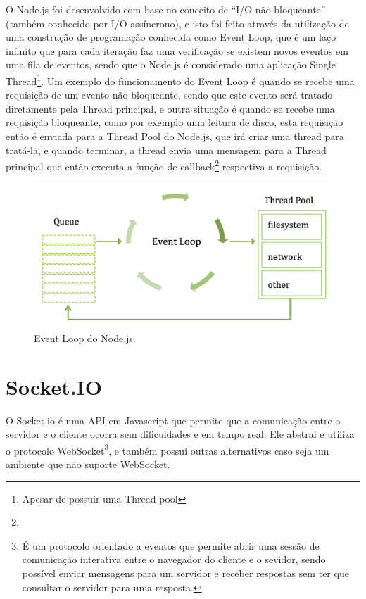 O Node.js foi desenvolvido com base no conceito de “I/O não bloqueante”\cite{nodeRight}  (também conhecido por I/O assíncrono), e isto foi feito através da utilização de uma construção  de programação conhecida como  Event Loop, que é um laço infinito que para cada iteração faz uma verificação se existem novos eventos em uma fila de eventos, sendo que o Node.js é considerado uma aplicação Single Thread\footnote{Apesar de possuir uma Thread pool}. Um exemplo do funcionamento do Event Loop é quando se recebe uma requisição de um evento não bloqueante, sendo que este evento será tratado diretamente pela Thread principal, e outra situação é quando se recebe uma requisição bloqueante, como por exemplo uma leitura de disco, esta requisição então é enviada para a Thread Pool do Node.js, que irá criar uma thread para tratá-la, e quando terminar, a thread envia uma mensagem para a Thread principal que então executa a função de callback\footnote{} respectiva a requisição.

    \begin{figure}[h]
    \centering
    \includegraphics[scale=0.3]{images/node_event_loop.png}
    \caption{Event Loop do Node.js.}
    \label{fig:Event Loop do Node.js}
    \end{figure}
    
\section{Socket.IO}

O Socket.io é uma API em Javascript que permite que a comunicação entre o servidor e o cliente ocorra sem dificuldades e em tempo real. Ele abstrai e utiliza o protocolo WebSocket\footnote{É um protocolo orientado a eventos que permite abrir uma sessão de comunicação interativa entre o navegador do cliente e o sevidor, sendo possível enviar mensagens para um servidor e receber respostas sem ter que consultar o servidor para uma resposta.},  e também possui outras alternativos caso seja um ambiente que não suporte WebSocket.